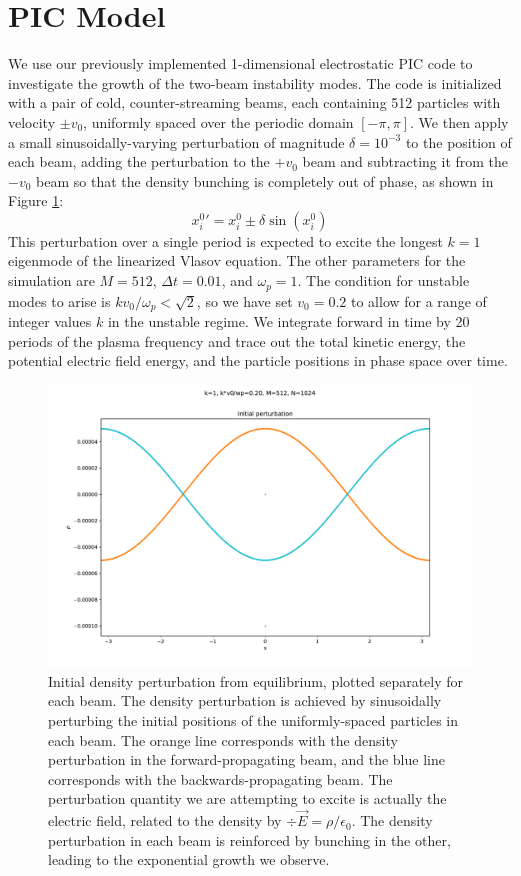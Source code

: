 \documentclass[%
 reprint,
 amsmath,amssymb,
 aps,
]{revtex4-2}
\begin{document}
\section{PIC Model}

We use our previously implemented 1-dimensional electrostatic PIC code to investigate the growth of the two-beam instability modes. The code is initialized with a pair of cold, counter-streaming beams, each containing 512 particles with velocity $\pm v_0$, uniformly spaced over the periodic domain $[- \pi, \pi]$. We then apply a small sinusoidally-varying perturbation of magnitude $\delta=10^{-3}$ to the position of each beam, adding the perturbation to the $+ v_0$ beam and subtracting it from the $- v_0$ beam so that the density bunching is completely out of phase, as shown in Figure \ref{fig:two-stream-initial-density}:
\begin{equation}
{x^0 _i}' = x^0 _i \pm \delta \sin(x^0 _i)
\end{equation}
This perturbation over a single period is expected to excite the longest $k=1$ eigenmode of the linearized Vlasov equation. The other parameters for the simulation are $M = 512$, $\Delta t = 0.01$, and $\omega_p = 1$. The condition for unstable modes to arise is $k v_0 / \omega_p < \sqrt{2}$, so we have set $v_0 = 0.2$ to allow for a range of integer values $k$ in the unstable regime. We integrate forward in time by 20 periods of the plasma frequency and trace out the total kinetic energy, the potential electric field energy, and the particle positions in phase space over time.

\begin{figure}
\includegraphics[width=0.9\linewidth]{proj3/two-stream-initial-density.pdf}
\caption{\label{fig:two-stream-initial-density}Initial density perturbation from equilibrium, plotted separately for each beam. The density perturbation is achieved by sinusoidally perturbing the initial positions of the uniformly-spaced particles in each beam. The orange line corresponds with the density perturbation in the forward-propagating beam, and the blue line corresponds with the backwards-propagating beam. The perturbation quantity we are attempting to excite is actually the electric field, related to the density by $\div \vec E = \rho/\epsilon_0$. The density perturbation in each beam is reinforced by bunching in the other, leading to the exponential growth we observe.}
\end{figure}
\end{document}
